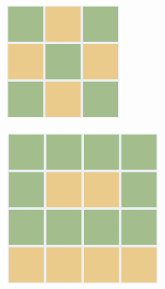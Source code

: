 \documentclass[12pt,twoside]{article}
\begin{document}
\begin{figure}[ht]
    \caption{}
    \unsethebrew
    \label{fig:sol_3_4_5}
    \centering
    \begin{subfigure}[b]{.25\linewidth}
    \includegraphics[width=\linewidth]{images/3x3_sol.PNG}
    \end{subfigure}
    \begin{subfigure}[b]{.25\linewidth}
    \includegraphics[width=\linewidth]{images/4x4_sol.PNG}

\end{subfigure}
\end{figure}
\end{document}
